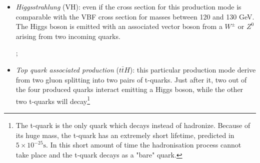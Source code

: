 \begin{itemize}
\begin{figure*}[h]
\end{figure*}
\item \emph{Higgsstrahlung} (VH): even if the cross section for this production mode is comparable with the VBF cross section for masses between 120 and 130 GeV. The Higgs boson is emitted with an associated vector boson from a $W^{\pm}$ or $Z^0$ arising from two incoming quarks.
\begin{figure*}[h]
\centering
{};
\end{figure*}
\item \emph{Top quark associated production} ($t\bar{t}H$): this particular production mode derive from two gluon splitting into two pairs of t-quarks. Just after it, two out of the four produced quarks interact emitting a Higgs boson, while the other two t-quarks will decay\footnote{The t-quark is the only quark which decays instead of hadronize. Because of its huge mass, the t-quark has an extremely short lifetime, predicted in $5 \times 10^{-25} \text{s}$. In this short amount of time the hadronisation process cannot take place and the t-quark decays as a "bare" quark.}
\begin{figure*}[!h]
\centering
{}
\end{figure*}
\end{itemize}
